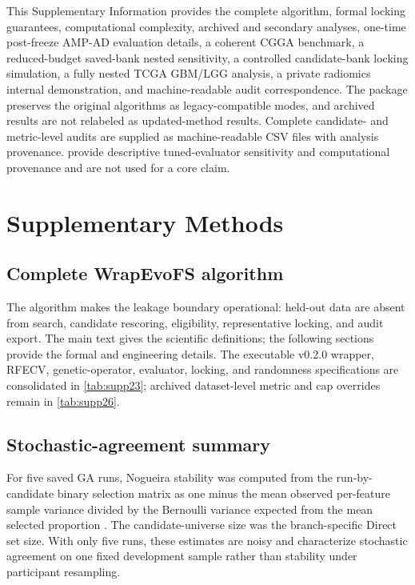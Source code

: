 \supplementarysetup
This Supplementary Information provides the complete algorithm, formal locking guarantees, computational complexity, archived and secondary analyses, one-time post-freeze AMP-AD evaluation details, a coherent CGGA benchmark, a reduced-budget saved-bank nested sensitivity, a controlled candidate-bank locking simulation, a fully nested TCGA GBM/LGG analysis, a private radiomics internal demonstration, and machine-readable audit correspondence. The package preserves the original algorithms as legacy-compatible modes, and archived results are not relabeled as updated-method results. Complete candidate- and metric-level audits are supplied as machine-readable CSV files with analysis provenance.  provide descriptive tuned-evaluator sensitivity and computational provenance and are not used for a core claim.


\section{Supplementary Methods}

\subsection{Complete WrapEvoFS algorithm}



The algorithm makes the leakage boundary operational: held-out data are absent from search, candidate rescoring, eligibility, representative locking, and audit export. The main text gives the scientific definitions; the following sections provide the formal and engineering details. The executable v0.2.0 wrapper, RFECV, genetic-operator, evaluator, locking, and randomness specifications are consolidated in \cref{tab:supp23}; archived dataset-level metric and cap overrides remain in \cref{tab:supp26}.

\subsection{Stochastic-agreement summary}

For five saved GA runs, Nogueira stability was computed from the run-by-candidate binary selection matrix as one minus the mean observed per-feature sample variance divided by the Bernoulli variance expected from the mean selected proportion \citep{ref36}. The candidate-universe size was the branch-specific Direct set size. With only five runs, these estimates are noisy and characterize stochastic agreement on one fixed development sample rather than stability under participant resampling.

